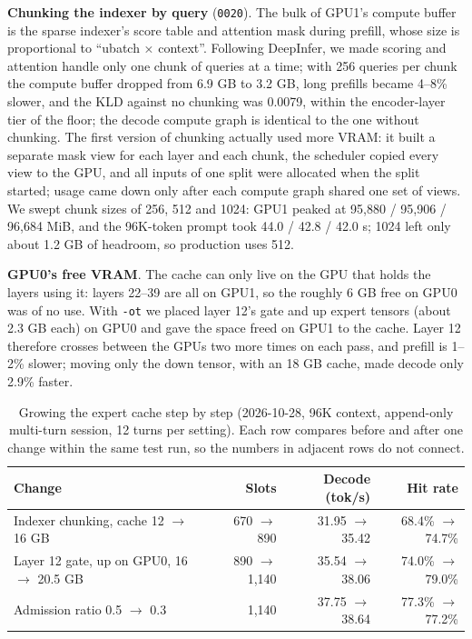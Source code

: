 \documentclass[11pt,a4paper]{article}
\newcommand{\code}[1]{\texttt{#1}}
\newcommand{\tps}{tok/s}
\begin{document}
\textbf{Chunking the indexer by query} (\code{0020}). The bulk of GPU1's compute buffer is the sparse indexer's score table and attention mask during prefill, whose size is proportional to ``ubatch × context''. Following DeepInfer, we made scoring and attention handle only one chunk of queries at a time; with 256 queries per chunk the compute buffer dropped from 6.9 GB to 3.2 GB, long prefills became 4--8\% slower, and the KLD against no chunking was 0.0079, within the encoder-layer tier of the floor; the decode compute graph is identical to the one without chunking. The first version of chunking actually used more VRAM: it built a separate mask view for each layer and each chunk, the scheduler copied every view to the GPU, and all inputs of one split were allocated when the split started; usage came down only after each compute graph shared one set of views. We swept chunk sizes of 256, 512 and 1024: GPU1 peaked at 95,880 / 95,906 / 96,684 MiB, and the 96K-token prompt took 44.0 / 42.8 / 42.0 s; 1024 left only about 1.2 GB of headroom, so production uses 512.

\textbf{GPU0's free VRAM}. The cache can only live on the GPU that holds the layers using it: layers 22--39 are all on GPU1, so the roughly 6 GB free on GPU0 was of no use. With \code{-ot} we placed layer 12's gate and up expert tensors (about 2.3 GB each) on GPU0 and gave the space freed on GPU1 to the cache. Layer 12 therefore crosses between the GPUs two more times on each pass, and prefill is 1--2\% slower; moving only the down tensor, with an 18 GB cache, made decode only 2.9\% faster.

\begin{table}[h]
  \centering
  \small
  \caption{Growing the expert cache step by step (2026-10-28, 96K context, append-only multi-turn session, 12 turns per setting). Each row compares before and after one change within the same test run, so the numbers in adjacent rows do not connect.}
  \label{tab:cachegrow}
  \begin{tabular}{@{}l r r r@{}}
    \toprule
    Change & Slots & Decode (\tps) & Hit rate \\
    \midrule
    Indexer chunking, cache 12 $\to$ 16 GB & 670 $\to$ 890 & 31.95 $\to$ 35.42 & 68.4\% $\to$ 74.7\% \\
    Layer 12 gate, up on GPU0, 16 $\to$ 20.5 GB & 890 $\to$ 1,140 & 35.54 $\to$ 38.06 & 74.0\% $\to$ 79.0\% \\
    Admission ratio 0.5 $\to$ 0.3 & 1,140 & 37.75 $\to$ 38.64 & 77.3\% $\to$ 77.2\% \\
    \bottomrule
  \end{tabular}
\end{table}
\end{document}
